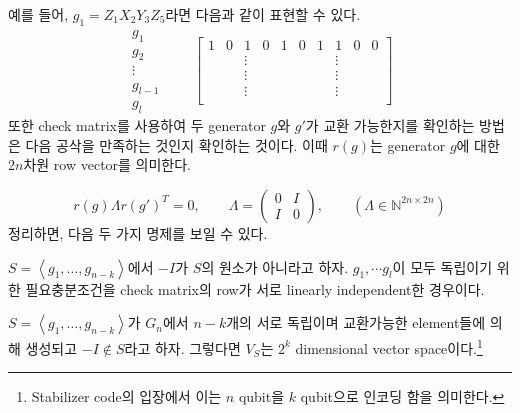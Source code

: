 예를 들어, $g_1 = Z_1X_2Y_3Z_5$라면 다음과 같이 표현할 수 있다.
\begin{equation*}
    \begin{matrix}
        g_1\\ 
        g_2 \\
        \vdots \\
        g_{l-1}\\
        g_l
    \end{matrix}
    \qquad 
    \left[\begin{array}{lllll|lllll}
        1 & 0 & 1 & 0 & 1 & 0 & 1 & 1 & 0 & 0\\
        && \vdots && &&&  \vdots & \\ 
        && \vdots && &&& \vdots & \\ 
        && \vdots && &&& \vdots & \\ 
    \end{array}\right]
\end{equation*}
또한 check matrix를 사용하여 두 generator $g$와 $g'$가 교환 가능한지를 확인하는 방법은 다음 공삭을 만족하는 것인지 확인하는 것이다. 이때 $r(g)$는 generator $g$에 대한 $2n$차원 row vector를 의미한다. 

\begin{equation*}
    r(g) \Lambda r(g')^T = 0, \qquad \Lambda=\left(\begin{array}{ll}
        0 & I \\
        I & 0
        \end{array}\right), \qquad (\Lambda \in \mathbb N^{2n \times 2n})
\end{equation*}
정리하면, 다음 두 가지 명제를 보일 수 있다.
\begin{proposition}
    $S=\left\langle g_1, \ldots, g_{n-k}\right\rangle$에서 $-I$가 $S$의 원소가 아니라고 하자. $g_1, \cdots g_l$이 모두 독립이기 위한 필요충분조건을 check matrix의 row가 서로 linearly independent한 경우이다.
\end{proposition}
\begin{proposition}
    $S=\left\langle g_1, \ldots, g_{n-k}\right\rangle$가 $G_n$에서 $n-k$개의 서로 독립이며 교환가능한 element들에 의해 생성되고 $-I \notin S$라고 하자. 그렇다면 $V_S$는 $2^k$ dimensional vector space이다.\footnote{Stabilizer code의 입장에서 이는 $n$ qubit을 $k$ qubit으로 인코딩 함을 의미한다.}
\end{proposition}


